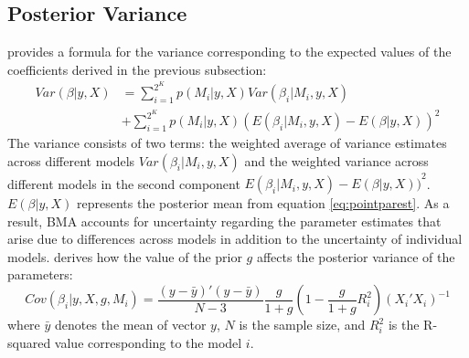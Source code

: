 \documentclass[a4paper,11pt]{article}
\begin{document}
\subsection*{Posterior Variance}
\citet{MoralBenito2012} provides a formula for the variance corresponding to the expected values of the coefficients derived in the previous subsection:
\begin{equation}\label{eq:postvar}
\begin{aligned}
Var(\beta \vert y, X) &= \sum_{i=1}^{2^{K}} p(M_{i} \vert y,X)Var(\beta_{i} \vert M_{i},y,X) \\ 
& +\sum_{i=1}^{2^{K}}p(M_{i} \vert y,X){(E(\beta_{i}\vert M_{i},y,X)-E(\beta \vert y, X))}^{2}
\end{aligned}
\end{equation}
The variance consists of two terms: the weighted average of variance estimates across different models $Var(\beta_{i} \vert M_{i},y,X)$ and the weighted variance across different models in the second component ${{E(\beta_{i}\vert  M_{i},y,X)}-{E(\beta \vert y,X))}}^{2}$. $E(\beta \vert y,X)$ represents the posterior mean from equation \ref{eq:pointparest}. As a result, \ac{BMA} accounts for uncertainty regarding the parameter estimates that arise due to differences across models in addition to the uncertainty of individual models. \citet{Zeugner2011} derives how the value of the prior $g$ affects the posterior variance of the parameters:
%
\begin{equation}\label{eq:postvarZ}
Cov(\beta_{i}\vert y,X,g,M_{i}) = \frac{(y-\bar{y})'(y-\bar{y})}{N-3} \frac{g}{1+g} \left( 1- \frac{g}{1+g}R_{i}^{2} \right) (X_{i}'X_{i})^{-1}
\end{equation}
where $\bar{y}$ denotes the mean of vector $y$, $N$ is the sample size, and $R^{2}_{i}$ is the R-squared value corresponding to the model $i$.
%
\end{document}
